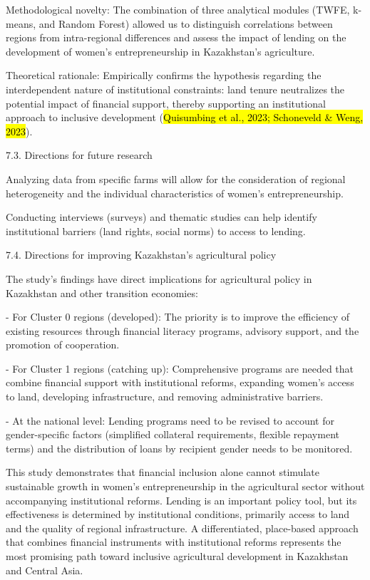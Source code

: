 Methodological novelty: The combination of three analytical modules
(TWFE, k-means, and Random Forest) allowed us to distinguish
correlations between regions from intra-regional differences and assess
the impact of lending on the development of women's entrepreneurship in
Kazakhstan's agriculture.

Theoretical rationale: Empirically confirms the hypothesis regarding the
interdependent nature of institutional constraints: land tenure
neutralizes the potential impact of financial support, thereby
supporting an institutional approach to inclusive development
(\hl{Quisumbing et al., 2023; Schoneveld \& Weng, 2023}).

7.3. Directions for future research

Analyzing data from specific farms will allow for the consideration of
regional heterogeneity and the individual characteristics of women's
entrepreneurship.

Conducting interviews (surveys) and thematic studies can help identify
institutional barriers (land rights, social norms) to access to lending.

7.4. Directions for improving Kazakhstan's agricultural policy

The study's findings have direct implications for agricultural policy in
Kazakhstan and other transition economies:

- For Cluster 0 regions (developed): The priority is to improve the
efficiency of existing resources through financial literacy programs,
advisory support, and the promotion of cooperation.

- For Cluster 1 regions (catching up): Comprehensive programs are needed
that combine financial support with institutional reforms, expanding
women's access to land, developing infrastructure, and removing
administrative barriers.

- At the national level: Lending programs need to be revised to account
for gender-specific factors (simplified collateral requirements,
flexible repayment terms) and the distribution of loans by recipient
gender needs to be monitored.

This study demonstrates that financial inclusion alone cannot stimulate
sustainable growth in women's entrepreneurship in the agricultural
sector without accompanying institutional reforms. Lending is an
important policy tool, but its effectiveness is determined by
institutional conditions, primarily access to land and the quality of
regional infrastructure. A differentiated, place-based approach that
combines financial instruments with institutional reforms represents the
most promising path toward inclusive agricultural development in
Kazakhstan and Central Asia.

